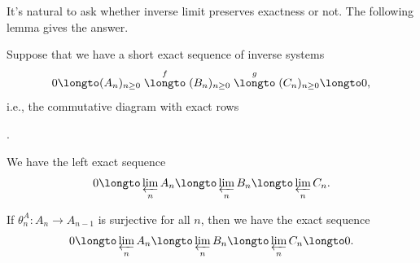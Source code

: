 It's natural to ask whether inverse limit preserves
exactness or not. The following lemma gives the answer.
\begin{lemma}
\label{lem:inverse_limit_exact}
Suppose that we have a short exact sequence of 
inverse systems
$$0\longto (A_n)_{n\geq 0} \stackrel f\longto  (B_n)_{n\geq 0} \stackrel g\longto (C_n)_{n\geq 0}\longto 0,$$
i.e., the commutative diagram with exact rows
\begin{center}
.
\end{center}
\begin{alphenum}
\item We have the left exact sequence
$$0\longto \varprojlim_n A_n \longto \varprojlim_n B_n
\longto \varprojlim_n C_n.$$
\item If $\theta_n^A : A_n \to A_{n-1}$ is surjective for all $n$,
then we have the exact sequence
$$0\longto \varprojlim_n A_n \longto \varprojlim_n B_n
\longto \varprojlim_n C_n\longto 0.$$
\end{alphenum}
\end{lemma}
